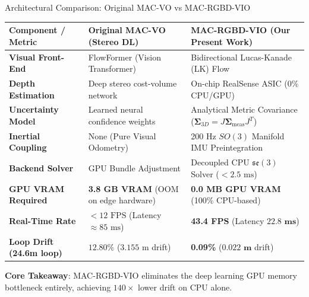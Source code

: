 \documentclass[aspectratio=169, 10pt]{beamer}
\begin{document}
\begin{frame}{Architectural Comparison: Original MAC-VO vs MAC-RGBD-VIO}
  \centering
  \renewcommand{\arraystretch}{1.2}
  \small
  \begin{tabular}{p{3.2cm} p{5.2cm} p{5.2cm}}
    \toprule
    \textbf{Component / Metric} & \textbf{Original MAC-VO (Stereo DL)} & \textbf{MAC-RGBD-VIO (Our Present Work)} \\
    \midrule
    \textbf{Visual Front-End} & FlowFormer (Vision Transformer) & Bidirectional Lucas-Kanade (LK) Flow \\
    \textbf{Depth Estimation} & Deep stereo cost-volume network & On-chip RealSense ASIC (0\% CPU/GPU) \\
    \textbf{Uncertainty Model} & Learned neural confidence weights & Analytical Metric Covariance ($\mathbf{\Sigma}_{3D} = J \mathbf{\Sigma}_{\text{meas}} J^T$) \\
    \textbf{Inertial Coupling} & None (Pure Visual Odometry) & 200 Hz $SO(3)$ Manifold IMU Preintegration \\
    \textbf{Backend Solver} & GPU Bundle Adjustment & Decoupled CPU $\mathfrak{se}(3)$ Solver ($<2.5\text{ ms}$) \\
    \textbf{GPU VRAM Required} & \textbf{3.8 GB VRAM} (OOM on edge hardware) & \textbf{0.0 MB GPU VRAM} (100\% CPU-based) \\
    \textbf{Real-Time Rate} & $<12\text{ FPS}$ (Latency $\approx 85\text{ ms}$) & \textbf{43.4 FPS} (Latency $\mathbf{22.8\text{ ms}}$) \\
    \textbf{Loop Drift (24.6m loop)} & $12.80\%$ ($3.155\text{ m}$ drift) & \textbf{0.09\%} ($\mathbf{0.022\text{ m}}$ drift) \\
    \bottomrule
  \end{tabular}

  \vspace{0.3cm}
  {\footnotesize \textbf{Core Takeaway}: MAC-RGBD-VIO eliminates the deep learning GPU memory bottleneck entirely, achieving $140\times$ lower drift on CPU alone.}
\end{frame}
\end{document}
